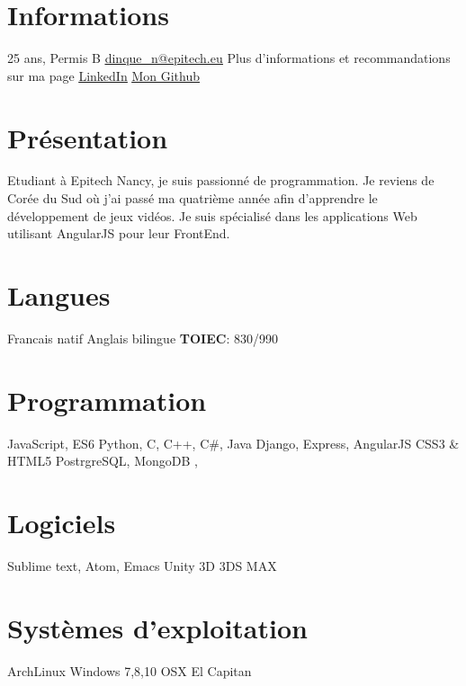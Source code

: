 \documentclass[]{friggeri-cv} %
\begin{document}
\begin{aside} %
\section{Informations}
25 ans, Permis B
\underline{\href{mailto:dinque\_n@epitech.eu}{dinque\_n@epitech.eu}}
Plus d'informations et recommandations sur ma page 	\underline{\href{https://fr.linkedin.com/in/nicolas-dinquel-70b50b4a}{LinkedIn}}
\underline{\href{https://github.com/Quayle57}{Mon Github}}
\section{Présentation}
Etudiant à Epitech Nancy, je suis passionné de programmation.
Je reviens de Corée du Sud où j'ai passé ma quatrième année afin d'apprendre le développement de jeux vidéos.
Je suis spécialisé dans les applications Web utilisant AngularJS pour leur FrontEnd.
\section{Langues}
Francais natif
Anglais bilingue
\textbf{TOIEC}: 830/990
\section{Programmation}
JavaScript, ES6
Python, C, C++, C\#, Java
Django, Express, AngularJS
CSS3 \& HTML5
PostrgreSQL, MongoDB
, 
\section{Logiciels}
Sublime text, Atom, Emacs
Unity 3D
3DS MAX
\section{Systèmes d'exploitation}
ArchLinux
Windows 7,8,10
OSX El Capitan
\end{aside}
\end{document}
